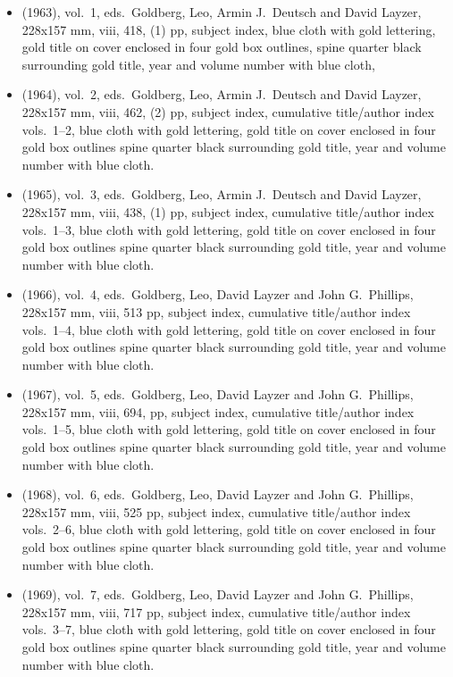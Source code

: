 \begin{itemize}
	\item (1963), vol.\ 1, eds.\ Goldberg, Leo, Armin J.\ Deutsch and David Layzer, 228x157 mm,
	viii, 418, (1) pp, subject index,
	blue cloth with gold lettering, gold title on cover enclosed in	four gold box outlines,
	spine quarter black surrounding gold title, year and volume number with blue cloth,
	
	\item (1964), vol.\ 2, eds.\ Goldberg, Leo, Armin J.\ Deutsch and David Layzer, 228x157 mm,
	viii, 462, (2) pp, subject index, cumulative title/author index vols.\ 1--2,
	blue cloth with gold lettering, gold title on cover enclosed in four gold box outlines
  spine quarter black surrounding gold title, year and volume number with blue cloth.
	
	\item (1965), vol.\ 3, eds.\ Goldberg, Leo, Armin J.\ Deutsch and David Layzer, 228x157 mm,
	viii, 438, (1) pp, subject index, cumulative title/author index vols.\ 1--3,
	blue cloth with gold lettering, gold title on cover enclosed in four gold box outlines
  spine quarter black surrounding gold title, year and volume number with blue cloth.
	
	\item (1966), vol.\ 4, eds.\ Goldberg, Leo, David Layzer and John G.\ Phillips, 228x157 mm,
	viii, 513 pp, subject index, cumulative title/author index vols.\ 1--4,
	blue cloth with gold lettering, gold title on cover enclosed in four gold box outlines
  spine quarter black surrounding gold title, year and volume number with blue cloth.
	
	\item (1967), vol.\ 5, eds.\ Goldberg, Leo, David Layzer and John G.\ Phillips, 228x157 mm,
	viii, 694, pp, subject index, cumulative title/author index vols.\ 1--5,
	blue cloth with gold lettering, gold title on cover enclosed in four gold box outlines
  spine quarter black surrounding gold title, year and volume number with blue cloth.
	
	\item (1968), vol.\ 6, eds.\ Goldberg, Leo, David Layzer and John G.\ Phillips, 228x157 mm,
	viii, 525 pp, subject index, cumulative title/author index vols.\ 2--6,
	blue cloth with gold lettering, gold title on cover enclosed in four gold box outlines
  spine quarter black surrounding gold title, year and volume number with blue cloth.
	
	\item (1969), vol.\ 7, eds.\ Goldberg, Leo, David Layzer and John G.\ Phillips, 228x157 mm,
	viii, 717 pp, subject index, cumulative title/author index vols.\ 3--7,
	blue cloth with gold lettering, gold title on cover enclosed in four gold box outlines
  spine quarter black surrounding gold title, year and volume number with blue cloth.
	

\end{itemize}
